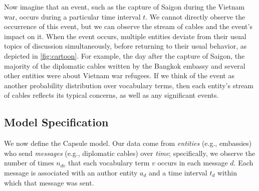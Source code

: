 Now imagine that an event, such as the capture of Saigon during the
Vietnam war, occurs during a particular time interval $t$. We cannot
directly observe the occurrence of this event, but we can observe the
stream of cables and the event's impact on it. When the event occurs,
multiple entities deviate from their usual topics of discussion
simultaneously, before returning to their usual behavior, as depicted
in \cref{fig:cartoon}. For example, the day after the capture of
Saigon, the majority of the diplomatic cables written by the Bangkok
embassy and several other entities were about Vietnam war refugees. If
we think of the event as another probability distribution over
vocabulary terms, then each entity's stream of cables reflects its
typical concerns, as well as any significant events.




\subsection{Model Specification}
\label{sec:model_spec}

We now define the Capsule model. Our data come from \emph{entities}
(e.g., embassies) who send \emph{messages} (e.g., diplomatic cables)
over \emph{time}; specifically, we observe the number of times
$n_{dv}$ that each vocabulary term $v$ occurs in each message
$d$. Each message is associated with an author entity $a_d$ and a time
interval $t_d$ within which that message was sent.


